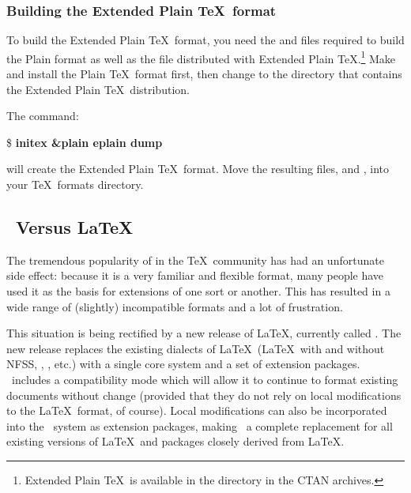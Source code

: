 \subsubsection{Building the Extended Plain \TeX\ format}

To build the Extended Plain \TeX\ format, you need the 
and  files   required to build the Plain format as well as
the  file   distributed with Extended Plain
\TeX.\footnote{Extended Plain \TeX\ is available in the
 directory in the CTAN archives.}  Make
and install the Plain \TeX\ format first, then change to the directory that
contains the Extended Plain \TeX\ distribution.

The command:

\begin{ttindent}
\$ \textbf{initex \&plain eplain \bs{}dump}
\end{ttindent}

will create the Extended Plain \TeX\ format.  Move the resulting
files,    and , into your \TeX\ formats
directory.

\subsection{\protect\LaTeXe\ Versus \protect\LaTeX}
\label{macpack:sec:latexvslatexe}

The tremendous popularity of  in the \TeX\ community has had an
unfortunate side effect: because it is a very familiar and flexible
format, many people have used it as the basis for extensions of one sort
or another.  This has resulted in a wide range of (slightly) incompatible
formats and a lot of frustration.  

This situation is being rectified by a new release of \LaTeX, currently called
.  The new 
release replaces the existing dialects of \LaTeX\ (\LaTeX\
with and without NFSS, \SliTeX, \AMSLaTeX, etc.) with a single core system
and a set of extension packages.  \LaTeXe\ includes a compatibility mode
which will allow it to continue to format existing documents without change
(provided that they do not rely on local modifications to the \LaTeX\
format, of course).  Local modifications can also be incorporated into
the \LaTeXe\ system as extension packages, making \LaTeXe\ a complete
replacement for all existing versions of \LaTeX\ and packages closely
derived from \LaTeX.

